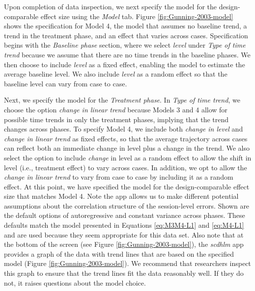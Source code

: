 \documentclass[
]{book}
\begin{document}
Upon completion of data inspection, we next specify the model for the design-comparable effect size using the \emph{Model} tab. Figure \ref{fig:Gunning-2003-model} shows the specification for Model 4, the model that assumes no baseline trend, a trend in the treatment phase, and an effect that varies across cases. Specification begins with the \emph{Baseline phase} section, where we select \emph{level} under \emph{Type of time trend} because we assume that there are no time trends in the baseline phases. We then choose to include \emph{level} as a fixed effect, enabling the model to estimate the average baseline level. We also include \emph{level} as a random effect so that the baseline level can vary from case to case.

Next, we specify the model for the \emph{Treatment phase}. In \emph{Type of time trend}, we choose the option \emph{change in linear trend} because Models 3 and 4 allow for possible time trends in only the treatment phases, implying that the trend changes across phases. To specify Model 4, we include both \emph{change in level} and \emph{change in linear trend} as fixed effects, so that the average trajectory across cases can reflect both an immediate change in level plus a change in the trend.
We also select the option to include \emph{change} in level as a random effect to allow the shift in level (i.e., treatment effect) to vary across cases. In addition, we opt to allow the \emph{change in linear trend} to vary from case to case by including it as a random effect. At this point, we have specified the model for the design-comparable effect size that matches Model 4. Note the app allows us to make different potential assumptions about the correlation structure of the session-level errors. Shown are the default options of autoregressive and constant variance across phases. These defaults match the model presented in Equations \eqref{eq:M3M4-L1} and \eqref{eq:M4-L1}
and are used because they seem appropriate for this data set.
Also note that at the bottom of the screen (see Figure \ref{fig:Gunning-2003-model}), the \emph{scdhlm} app provides a graph of the data with trend lines that are based on the specified model (Figure \ref{fig:Gunning-2003-model}). We recommend that researchers inspect this graph to ensure that the trend lines fit the data reasonably well. If they do not, it raises questions about the model choice.
\end{document}
